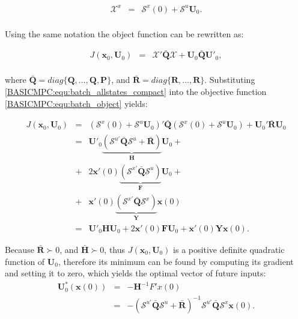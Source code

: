     \begin{equation}
        \begin{array}{rcl}
        \mathcal{X}^x&=&\mathcal{S}^x(0)+\mathcal{S}^u\textbf{U}_0.\\
		\end{array}
        \label{BASICMPC:equ:batch_allstates_compact}
    \end{equation}

    Using the same notation the object function can be rewritten as:

    \begin{equation}
        \begin{array}{rcl}
        J(\textbf{x}_0,\textbf{U}_0)&=&\mathcal{X}'\bar{\textbf{Q}}\mathcal{X}+\textbf{U}_0\bar{\textbf{Q}}\textbf{U}'_0,\\
		\end{array}
        \label{BASICMPC:equ:batch_object}
    \end{equation}

    where $\bar{\textbf{Q}}=diag\{\textbf{Q},\dots,\textbf{Q},\textbf{P}\}$, and $\bar{\textbf{R}}=diag\{\textbf{R},\dots,\textbf{R}\}$. Substituting \ref{BASICMPC:equ:batch_allstates_compact} into the objective function \ref{BASICMPC:equ:batch_object} yields:

    \begin{equation}
        \begin{array}{rcl}
        J(\textbf{x}_0,\textbf{U}_0)&=&(\mathcal{S}^x(0)+\mathcal{S}^u\textbf{U}_0)'\bar{\textbf{Q}}(\mathcal{S}^x(0)+\mathcal{S}^u\textbf{U}_0)+\textbf{U}_0'\bar{\textbf{R}}\textbf{U}_0\\
        &=&\textbf{U}'_0\underbrace{(\mathcal{S}^{u'}\bar{\textbf{Q}}\mathcal{S}^u+\bar{\textbf{R}})}_{\textbf{H}}\textbf{U}_0+ \\
        &+&2\textbf{x}'(0)\underbrace{(\mathcal{S}^{x'}\bar{\textbf{Q}}\mathcal{S}^u)}_{\textbf{F}}\textbf{U}_0+\\
        &+&\textbf{x}'(0)\underbrace{(\mathcal{S}^{x'}\bar{\textbf{Q}}\mathcal{S}^x)}_{\textbf{Y}}\textbf{x}(0)\\
        &=&\textbf{U}'_0\textbf{H}\textbf{U}_0+2\textbf{x}'(0)\textbf{F}\textbf{U}_0+\textbf{x}'(0)\textbf{Y}\textbf{x}(0).
		\end{array}
        \label{BASICMPC:equ:batch_simplfy}
    \end{equation}

    Because $\bar{\textbf{R}}\succ 0$, and $\bar{\textbf{H}}\succ 0$, thus $J(\textbf{x}_0,\textbf{U}_0)$ is a positive definite quadratic function of $\textbf{U}_0$, therefore its minimum can be found by computing its gradient and setting it to zero, which yields the optimal vector of future inputs:
%
    \begin{equation}
        \begin{array}{rcl}
        \textbf{U}^*_0(\textbf{x}(0))&=&-\textbf{H}^{-1}F'x(0)\\
        &=&-(\mathcal{S}^{u'}\bar{\textbf{Q}}\mathcal{S}^{u}+\bar{\textbf{R}})^{-1}\mathcal{S}^{u'}\bar{\textbf{Q}}\mathcal{S}^{x}\textbf{x}(0).
		\end{array}
        \label{BASICMPC:equ:batch_optimal_solution}
    \end{equation}


